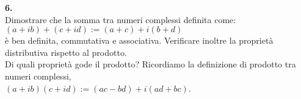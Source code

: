 \documentclass[italian,a4paper,11pt]
{article}
\begin{document}
\vspace{0.4cm}
\noindent
\begin{Ex}\textbf{ 6.}\\
Dimostrare che la somma tra numeri complessi definita come:\\$(a+ib)+(c+id):=(a+c)+i(b+d)$\\ \`e ben definita, commutativa e associativa. Verificare inoltre la propriet\`a distributiva rispetto al prodotto.\\
Di quali propriet\`a gode il prodotto? Ricordiamo la definizione di prodotto tra numeri complessi,\\    $\displaystyle(a+ib)(c+id):=(ac-bd)+i(ad+bc)$.
\end{Ex}
\end{document}
